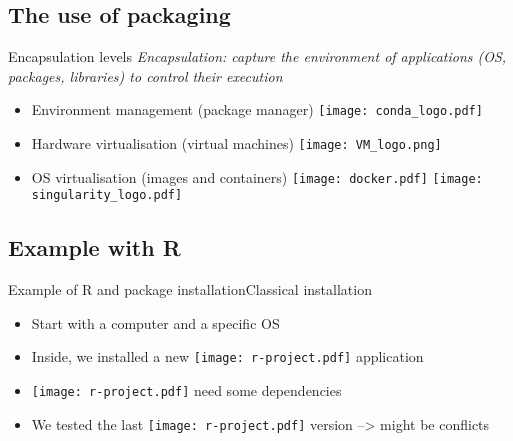 \subsection{The use of packaging}
\begin{frame}[<+->]{Encapsulation levels}
\textit{Encapsulation: capture the environment of applications (OS, packages, libraries) to control their execution}
\begin{itemize}[<+->]
	\item Environment management (package manager) \texttt{[image: conda\_logo.pdf]} 
	\item Hardware virtualisation (virtual machines) \texttt{[image: VM\_logo.png]} 
	\item OS virtualisation (images and containers) \texttt{[image: docker.pdf]} \texttt{[image: singularity\_logo.pdf]} 

\end{itemize}
\end{frame}

\subsection{Example with R}
\begin{frame}{Example of R and package installation}{Classical installation}
\begin{itemize}[<+->]
	\item Start with a computer and a specific OS
	\item Inside, we installed a new \texttt{[image: r-project.pdf]} application
	\item \texttt{[image: r-project.pdf]} need some dependencies
	\item We tested the last  \texttt{[image: r-project.pdf]} version --> might be conflicts
\end{itemize}

\end{frame}

